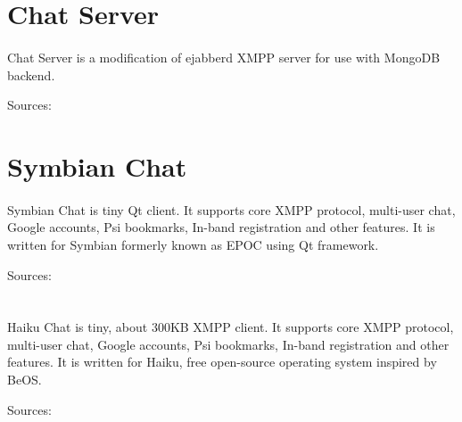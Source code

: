 \documentclass[11pt]{article}
\begin{document}
\section*{Chat Server}
\paragraph{}
Chat Server is a modification of ejabberd XMPP server for use with MongoDB backend.

Sources: 



\section*{Symbian Chat}
\paragraph{}
Symbian Chat is tiny Qt client. It supports core XMPP protocol,
multi-user chat, Google accounts, Psi bookmarks, In-band registration
and other features. It is written for Symbian formerly known as EPOC using Qt framework.

Sources: 


\section*{}
\paragraph{}
Haiku Chat is tiny, about 300KB XMPP client.
It supports core XMPP protocol, multi-user chat, Google accounts,
Psi bookmarks, In-band registration and other features.
It is written for Haiku, free open-source operating system inspired by BeOS.

Sources: 
\end{document}
